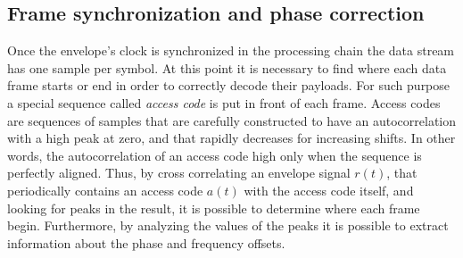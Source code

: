 
\subsection{Frame synchronization and phase correction} \label{sec:phasecorr}

Once the envelope's clock is synchronized in the processing chain the data stream has one sample per symbol. At this point it is necessary to find where each data frame starts or end in order to correctly decode their payloads. For such purpose a special sequence called \emph{access code} is put in front of each frame. Access codes are sequences of samples that are carefully constructed to have an autocorrelation with a high peak at zero, and that rapidly decreases for increasing shifts. In other words, the autocorrelation of an access code high only when the sequence is perfectly aligned. Thus, by cross correlating an envelope signal \(r(t)\), that periodically contains an access code \(a(t)\) with the access code itself, and looking for peaks in the result, it is possible to determine where each frame begin. Furthermore, by analyzing the values of the peaks it is possible to extract information about the phase and frequency offsets.

